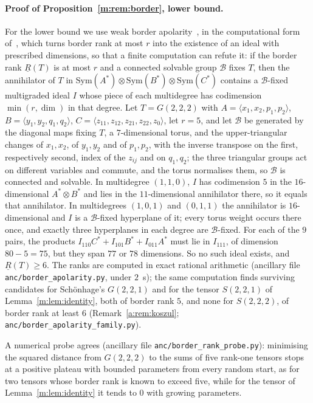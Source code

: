 \documentclass[11pt]{article}
\theoremstyle{definition}
\theoremstyle{remark}
\begin{document}
\paragraph{Proof of Proposition~\ref{m:rem:border}, lower bound.} For the lower bound we use weak border apolarity~\cite[Theorem 1.2 with Theorem 4.3]{BB21}, in the computational form of~\cite{CHL23}, which turns border rank at most $r$ into the existence of an ideal with prescribed dimensions, so that a finite computation can refute it: if the border rank $\underline R(T)$ is at most $r$ and a connected solvable group $\mathcal B$ fixes $T$, then the annihilator of $T$ in $\mathrm{Sym}(A^*)\otimes\mathrm{Sym}(B^*)\otimes\mathrm{Sym}(C^*)$ contains a $\mathcal B$-fixed multigraded ideal $I$ whose piece of each multidegree has codimension $\min(r,\dim)$ in that degree. Let $T=G(2,2,2)$ with $A=\langle x_1,x_2,p_1,p_2\rangle$, $B=\langle y_1,y_2,q_1,q_2\rangle$, $C=\langle z_{11},z_{12},z_{21},z_{22},z_0\rangle$, let $r=5$, and let $\mathcal B$ be generated by the diagonal maps fixing $T$, a $7$-dimensional torus, and the upper-triangular changes of $x_1,x_2$, of $y_1,y_2$ and of $p_1,p_2$, with the inverse transpose on the first, respectively second, index of the $z_{ij}$ and on $q_1,q_2$; the three triangular groups act on different variables and commute, and the torus normalises them, so $\mathcal B$ is connected and solvable. In multidegree $(1,1,0)$, $I$ has codimension $5$ in the $16$-dimensional $A^*\otimes B^*$ and lies in the $11$-dimensional annihilator there, so it equals that annihilator. In multidegrees $(1,0,1)$ and $(0,1,1)$ the annihilator is $16$-dimensional and $I$ is a $\mathcal B$-fixed hyperplane of it; every torus weight occurs there once, and exactly three hyperplanes in each degree are $\mathcal B$-fixed. For each of the $9$ pairs, the products $I_{110}C^*+I_{101}B^*+I_{011}A^*$ must lie in $I_{111}$, of dimension $80-5=75$, but they span $77$ or $78$ dimensions. So no such ideal exists, and $\underline R(T)\ge6$. The ranks are computed in exact rational arithmetic (ancillary file \texttt{anc/border\_apolarity.py}, under $2$~s); the same computation finds surviving candidates for Schönhage's $G(2,2,1)$ and for the tensor $S(2,2,1)$ of Lemma~\ref{m:lem:identity}, both of border rank $5$, and none for $S(2,2,2)$, of border rank at least $6$ (Remark~\ref{a:rem:koszul}; \texttt{anc/border\_apolarity\_family.py}).

A numerical probe agrees (ancillary file \texttt{anc/border\_rank\_probe.py}): minimising the squared distance from $G(2,2,2)$ to the sums of five rank-one tensors stops at a positive plateau with bounded parameters from every random start, as for two tensors whose border rank is known to exceed five, while for the tensor of Lemma~\ref{m:lem:identity} it tends to $0$ with growing parameters.
\end{document}
